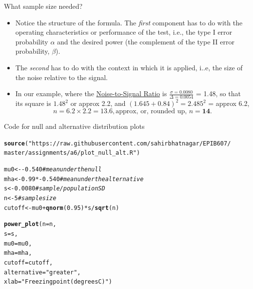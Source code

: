 \documentclass[10pt]{beamer}\usepackage[]{graphicx}\usepackage[]{color}
\makeatletter
\newcommand{\hlnum}[1]{\textcolor[rgb]{0.686,0.059,0.569}{#1}}%
\newcommand{\hlstr}[1]{\textcolor[rgb]{0.192,0.494,0.8}{#1}}%
\newcommand{\hlcom}[1]{\textcolor[rgb]{0.678,0.584,0.686}{\textit{#1}}}%
\newcommand{\hlopt}[1]{\textcolor[rgb]{0,0,0}{#1}}%
\newcommand{\hlstd}[1]{\textcolor[rgb]{0.345,0.345,0.345}{#1}}%
\newcommand{\hlkwb}[1]{\textcolor[rgb]{0.69,0.353,0.396}{#1}}%
\newcommand{\hlkwc}[1]{\textcolor[rgb]{0.333,0.667,0.333}{#1}}%
\newcommand{\hlkwd}[1]{\textcolor[rgb]{0.737,0.353,0.396}{\textbf{#1}}}%
\newenvironment{kframe}{%
 \def\at@end@of@kframe{}%
 \ifinner\ifhmode%
  \def\at@end@of@kframe{\end{minipage}}%
  \begin{minipage}{\columnwidth}%
 \fi\fi%
 \def\FrameCommand##1{\hskip\@totalleftmargin \hskip-\fboxsep
 \colorbox{shadecolor}{##1}\hskip-\fboxsep
     \hskip-\linewidth \hskip-\@totalleftmargin \hskip\columnwidth}%
 \MakeFramed {\advance\hsize-\width
   \@totalleftmargin\z@ \linewidth\hsize
   \@setminipage}}%
 {\par\unskip\endMakeFramed%
 \at@end@of@kframe}
\newenvironment{knitrout}{}{} %
\makeatother
\begin{document}
\begin{frame}{What sample size needed?}
	\begin{itemize}
		\setlength\itemsep{1em}
		\item Notice the structure of the formula. The \textit{first} component has to do
		with the operating characteristics or performance of the test, i.e.,
		the type I error probability $\alpha$ and the desired power (the complement of the type II error probability, $\beta$).
		
		\pause 
		
		\item The \textit{second} has to do	with the context in which it is applied, i..e, the size of the noise relative to the  signal. \pause 
		
		\item In our example, where the \underline{Noise-to-Signal Ratio} is $\frac{\sigma = 0.0080}{\Delta = 0.0054}$ = 1.48, so that its square is $1.48^2$ or approx 2.2,	and $(1.645 + 0.84)^2 = 2.485^2$ = approx 6.2,	$$  n = 6.2  \times 2.2  =  13.6, \textrm{approx, or, rounded up,  } n = \textbf{14}. $$
	\end{itemize}
\end{frame}



\begin{frame}[fragile]{Code for null and alternative distribution plots}
\begin{knitrout}\tiny
{}\color{fgcolor}\begin{kframe}
\begin{alltt}
\hlkwd{source}\hlstd{(}\hlstr{"https://raw.githubusercontent.com/sahirbhatnagar/EPIB607/
master/assignments/a6/plot_null_alt.R"}\hlstd{)}

\hlstd{mu0} \hlkwb{<-} \hlopt{-}\hlnum{0.540} \hlcom{# mean under the null}
\hlstd{mha} \hlkwb{<-} \hlnum{0.99}\hlopt{*-}\hlnum{0.540} \hlcom{# mean under the alternative}
\hlstd{s} \hlkwb{<-} \hlnum{0.0080} \hlcom{# sample/population SD}
\hlstd{n} \hlkwb{<-} \hlnum{5} \hlcom{# sample size}
\hlstd{cutoff} \hlkwb{<-} \hlstd{mu0} \hlopt{+} \hlkwd{qnorm}\hlstd{(}\hlnum{0.95}\hlstd{)} \hlopt{*} \hlstd{s} \hlopt{/} \hlkwd{sqrt}\hlstd{(n)}

\hlkwd{power_plot}\hlstd{(}\hlkwc{n} \hlstd{= n,}
\hlkwc{s} \hlstd{= s,}
\hlkwc{mu0} \hlstd{= mu0,}
\hlkwc{mha} \hlstd{= mha,}
\hlkwc{cutoff} \hlstd{= cutoff,}
\hlkwc{alternative} \hlstd{=} \hlstr{"greater"}\hlstd{,}
\hlkwc{xlab} \hlstd{=} \hlstr{"Freezing point (degrees C)"}\hlstd{)}
\end{alltt}
\end{kframe}
\end{knitrout}
\end{frame}
\end{document}
